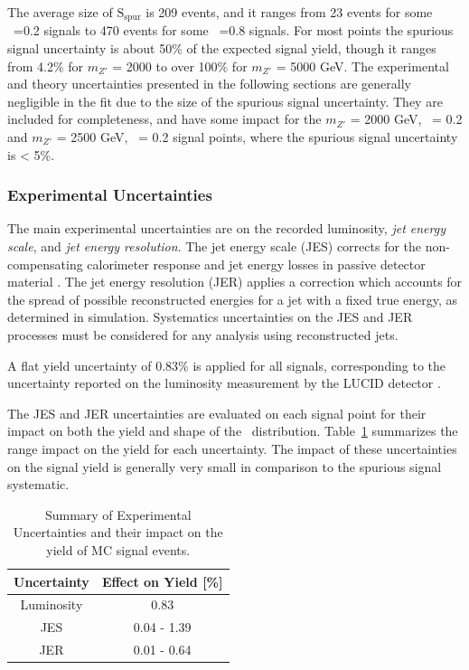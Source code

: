 The average size of $\text{S}_{\text{spur}}$ is 209 events, and it ranges from 23 events for some \rinv~=0.2 signals to 470 events for some \rinv~=0.8 signals.
For most points the spurious signal uncertainty is about 50\% of the expected signal yield, though it ranges from 4.2\% for $m_{Z'}$ = 2000 to over 100\% for $m_{Z'}$ = 5000 GeV.
The experimental and theory uncertainties presented in the following sections are generally negligible in the fit due to the size of the spurious signal uncertainty.
They are included for completeness, and have some impact for the $m_{Z'}$ = 2000 GeV, \rinv~= 0.2 and $m_{Z'}$ = 2500 GeV, \rinv~= 0.2 signal points, where the spurious signal uncertainty is < 5\%. 
\subsubsection{Experimental Uncertainties}
The main experimental uncertainties are on the recorded luminosity, \textit{jet energy scale}, and \textit{jet energy resolution}.
The jet energy scale (JES) corrects for the non-compensating calorimeter response and jet energy losses in passive detector material \cite{jes_jer}.
The jet energy resolution (JER) applies a correction which accounts for the spread of possible reconstructed energies for a jet with a fixed true energy, as determined in simulation.
Systematics uncertainties on the JES and JER processes must be considered for any analysis using reconstructed jets.

A flat yield uncertainty of 0.83\% is applied for all signals, corresponding to the uncertainty reported on the luminosity measurement by the LUCID detector \cite{lucid_uncertainty}. 

The JES and JER uncertainties are evaluated on each signal point for their impact on both the yield and shape of the \mt~distribution.
Table~\ref{tab:exp_syst} summarizes the range impact on the yield for each uncertainty.
The impact of these uncertainties on the signal yield is generally very small in comparison to the spurious signal systematic.

\begin{table}
\centering
  \begin{tabular}{ |c|c| }
    \hline
    Uncertainty & Effect on Yield [\%] \\
    \hline
     Luminosity & 0.83 \\
     JES & 0.04 - 1.39 \\
     JER & 0.01 - 0.64 \\
    \hline
  \end{tabular}
  \caption{Summary of Experimental Uncertainties and their impact on the yield of MC signal events.}
  \label{tab:exp_syst}
\end{table}


